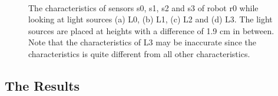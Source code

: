 \begin{figure}[t]
\centering
{}
\\
\caption{The characteristics of sensors s0, s1, s2 and s3 of robot r0 while looking at light sources (a) L0, (b) L1, (c) L2 and (d) L3. The light sources are placed at heights with a difference of 1.9 cm in between. Note that the characteristics of L3 may be inaccurate since the characteristics is quite different from all other characteristics.}
\label{f:int:calibration}
\end{figure}

\subsection{The Results}

